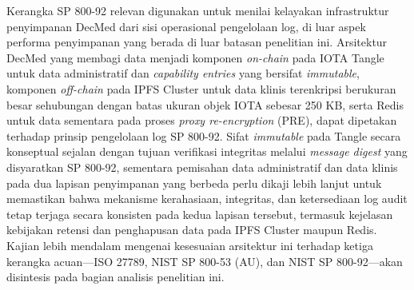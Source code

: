 Kerangka SP 800-92 relevan digunakan untuk menilai kelayakan infrastruktur penyimpanan DecMed dari sisi operasional pengelolaan log, di luar aspek performa penyimpanan yang berada di luar batasan penelitian ini. Arsitektur DecMed yang membagi data menjadi komponen \textit{on-chain} pada IOTA Tangle untuk data administratif dan \textit{capability entries} yang bersifat \textit{immutable}, komponen \textit{off-chain} pada IPFS Cluster untuk data klinis terenkripsi berukuran besar sehubungan dengan batas ukuran objek IOTA sebesar 250 KB, serta Redis untuk data sementara pada proses \textit{proxy re-encryption} (PRE), dapat dipetakan terhadap prinsip pengelolaan log SP 800-92. Sifat \textit{immutable} pada Tangle secara konseptual sejalan dengan tujuan verifikasi integritas melalui \textit{message digest} yang disyaratkan SP 800-92, sementara pemisahan data administratif dan data klinis pada dua lapisan penyimpanan yang berbeda perlu dikaji lebih lanjut untuk memastikan bahwa mekanisme kerahasiaan, integritas, dan ketersediaan log audit tetap terjaga secara konsisten pada kedua lapisan tersebut, termasuk kejelasan kebijakan retensi dan penghapusan data pada IPFS Cluster maupun Redis. Kajian lebih mendalam mengenai kesesuaian arsitektur ini terhadap ketiga kerangka acuan---ISO 27789, NIST SP 800-53 (AU), dan NIST SP 800-92---akan disintesis pada bagian analisis penelitian ini.